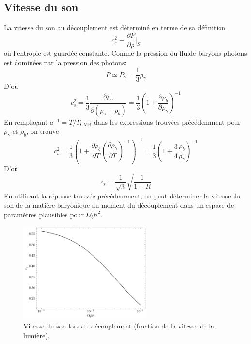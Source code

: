 \documentclass{article}
\numberwithin{equation}{section}
\begin{document}
\subsection{Vitesse du son}
La vitesse du son au découplement est déterminé en terme de sa définition
\[
        c_s^2 \equiv \frac{\partial P}{\partial \rho}\bigg|_{S}
\]
où l'entropie est guardée constante. Comme la pression du fluide 
baryons-photons est dominées par la pression des photons:
\[
        P \simeq P_\gamma = \frac{1}{3}\rho_\gamma
\]
D'où
\[
        c_s^2 = \frac{1}{3}\frac{\partial \rho_\gamma}{\partial (\rho_\gamma + \rho_b)}
        = \frac{1}{3}\left( 1 + \frac{\partial \rho_b}{\partial \rho_\gamma } \right)^{-1}
\]
En remplaçant $a^{-1} = T/T_{\text{CMB}}$ dans les expressions trouvées précédemment 
pour $\rho_\gamma$ et $\rho_b$, on trouve
\[
        c_s^2 = \frac{1}{3}\left( 1 + \frac{\partial \rho_b}{\partial T} 
        \left( \frac{\partial \rho_\gamma}{\partial T} \right)^{-1}\right)^{-1}
        = 
        \frac{1}{3} \left( 1 + \frac{3}{4}\frac{\rho_b}{\rho_\gamma} \right)^{-1}
\]
D'où
\[
        c_s = \frac{1}{\sqrt{3}}\sqrt{\frac{1}{1 + R}}
\]
En utilisant la réponse trouvée précédemment, on peut déterminer la vitesse 
du son de la matière baryonique au moment du découplement dans un 
espace de paramètres plausibles pour $\Omega_b h^2$.
\begin{figure}[H]
        \centering
        \includegraphics[width=0.6\textwidth]{speed_of_sound}
        \caption{Vitesse du son lors du découplement (fraction de la 
        vitesse de la lumière).}
        \label{fig:spped_of_sound}
\end{figure}
\end{document}
